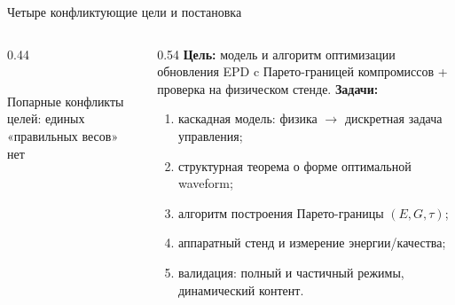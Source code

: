 \documentclass[aspectratio=169,11pt]{beamer}
\newcommand{\src}[1]{{\tiny\color{black!45}#1}}
\begin{document}
\begin{frame}{Четыре конфликтующие цели и постановка}
  \begin{columns}[T]
    \begin{column}{0.44\textwidth}
      \centering
      \\[2mm]
      \src{Попарные конфликты целей: единых «правильных весов» нет}
    \end{column}
    \begin{column}{0.54\textwidth}
      \textbf{Цель:} модель и алгоритм оптимизации обновления EPD c Парето-границей компромиссов + проверка на физическом стенде.
      \vspace{1.5mm}
      \textbf{Задачи:}
      \begin{enumerate}\small
        \item каскадная модель: физика $\to$ дискретная задача управления;
        \item структурная теорема о форме оптимальной waveform;
        \item алгоритм построения Парето-границы $(E, G, \tau)$;
        \item аппаратный стенд и измерение энергии/качества;
        \item валидация: полный и частичный режимы, динамический контент.
      \end{enumerate}
    \end{column}
  \end{columns}
\end{frame}
\end{document}
